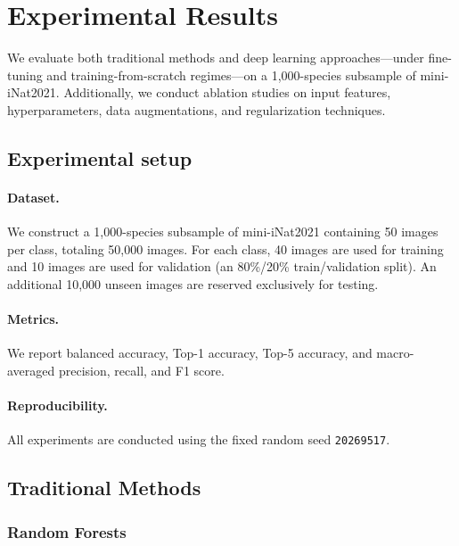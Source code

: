 \section{Experimental Results}
\label{sec:experiments}

We evaluate both traditional methods and deep learning approaches—under fine-tuning and training-from-scratch regimes—on a 1{,}000-species subsample of mini-iNat2021. Additionally, we conduct ablation studies on input features, hyperparameters, data augmentations, and regularization techniques.

\subsection{Experimental setup}
\label{sec:exp-setup}

\paragraph{Dataset.}
We construct a 1{,}000-species subsample of mini-iNat2021 containing 50 images per class, totaling 50,000 images. For each class, 40 images are used for training and 10 images are used for validation (an 80\%/20\% train/validation split). An additional 10,000 unseen images are reserved exclusively for testing.

\paragraph{Metrics.}
We report balanced accuracy, Top-1 accuracy, Top-5 accuracy, and macro-averaged precision, recall, and F1 score.

\paragraph{Reproducibility.}
All experiments are conducted using the fixed random seed \texttt{20269517}.

\subsection{Traditional Methods}
\label{sec:trad-methods}

\subsubsection{Random Forests}
\label{sec:trad-rf}

